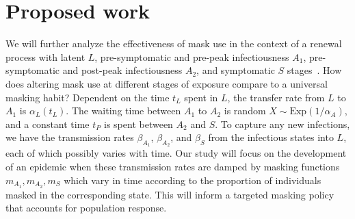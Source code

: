 \documentclass[11pt]{article}
\begin{document}
\section*{Proposed work}
We will further analyze the effectiveness of mask use in the context of a renewal process with latent $L$, pre-symptomatic and pre-peak infectiousness $A_{1}$, pre-symptomatic and post-peak infectiousness $A_{2}$, and symptomatic $S$ stages~\cite{tian2021harnessing}. How does altering mask use at different stages of exposure compare to a universal masking habit? Dependent on the time $t_{L}$ spent in $L$, the transfer rate from $L$ to $A_{1}$ is $\alpha_{L}(t_{L})$. The waiting time between $A_{1}$ to $A_{2}$ is random $X \sim \text{Exp}(1/\alpha_{A})$, and a constant time $t_{P}$ is spent between $A_{2}$ and $S$. To capture any new infections, we have the transmission rates $\beta_{A_{1}}$, $\beta_{A_{2}}$, and $\beta_{S}$ from the infectious states into $L$, each of which possibly varies with time. Our study will focus on the development of an epidemic when these transmission rates are damped by masking functions $m_{A_{1}}, m_{A_{2}}, m_{S}$ which vary in time according to the proportion of individuals masked in the corresponding state. This will inform a targeted masking policy that accounts for population response.

\printbibliography
\end{document}
